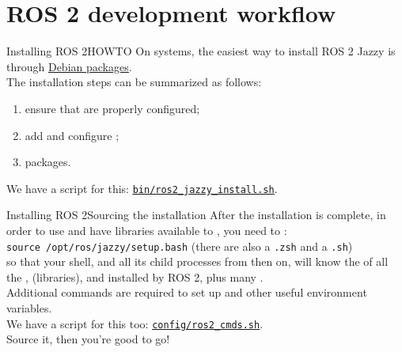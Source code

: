 
\section{ROS 2 development workflow}
\graphicspath{{figs/section1/}}

\begin{frame}{Installing ROS 2}{HOWTO}
  \justifying
  On  systems, the easiest way to install ROS 2 Jazzy is through \href{https://docs.ros.org/en/jazzy/Installation/Ubuntu-Install-Debians.html}{\color{blue}\underline{Debian packages}}.\\
  \bigskip
  The installation steps can be summarized as follows:
  \begin{enumerate}
    \item ensure that  are properly configured;
    \item add and configure ;
    \item {} packages.
  \end{enumerate}
  We have a script for this: \href{https://github.com/IntelligentSystemsLabUTV/ros2-examples/blob/jazzy/bin/ros2_jazzy_install.sh}{\color{blue}\underline{\texttt{bin/ros2\_jazzy\_install.sh}}}.
\end{frame}
\begin{frame}{Installing ROS 2}{Sourcing the installation}
  \justifying
  After the installation is complete, in order to use  and have libraries available to , you need to :\\
  \bigskip
  \texttt{source /opt/ros/jazzy/setup.bash} (there are also a \texttt{.zsh} and a \texttt{.sh})\\
  \bigskip
  so that your shell, and all its child processes from then on, will know the  of all the ,  (libraries), and  installed by ROS 2, plus many .\\
  \bigskip
  Additional commands are required to set up  and other useful environment variables.\\
  We have a script for this too: \href{https://github.com/IntelligentSystemsLabUTV/ros2-examples/blob/jazzy/config/ros2_cmds.sh}{\color{blue}\underline{\texttt{config/ros2\_cmds.sh}}}.\\
  Source it, then you're good to go!
\end{frame}

